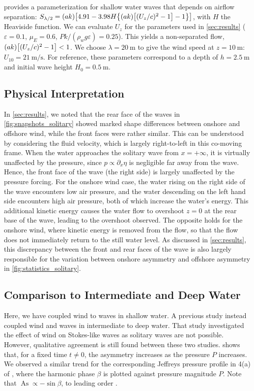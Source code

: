\documentclass{jfm}
\DeclareMathOperator{\As}{As}
\renewcommand*{\epsilon}{\varepsilon}
\begin{document}
 provides a parameterization for shallow water
waves that depends on airflow separation: $S_{\lambda/2} =
(ak)\bqty{4.91-3.98 H\Bqty{(ak)\bqty{(U_z/c)^2-1} - 1}}$, with $H$ the
Heaviside function.
We can evaluate $U_z$ for the parameters used in \cref{sec:results}
($\epsilon=0.1$, $\mu_E = 0.6$, $Pk/(\rho_w g \epsilon) = 0.25$).
This yields a non-separated flow, $(ak)\bqty{(U_z/c)^2-1} < 1$.
We choose $\lambda = \SI{20}{\meter}$ to give the wind speed at
$z=\SI{10}{\meter}$: $U_{10} = \SI{21}{\meter\per\second}$.
For reference, these parameters correspond to a depth of $h =
\SI{2.5}{\meter}$ and initial wave height $H_0 = \SI{0.5}{\meter}$.

\subsection{Physical Interpretation}
In \cref{sec:results}, we noted that the rear face of the waves in
\cref{fig:snapshots_solitary} showed marked shape differences between
onshore and offshore wind, while the front faces were rather similar.
This can be understood by considering the fluid velocity, which is
largely right-to-left in this co-moving frame.
When the water approaches the solitary wave from $x = +\infty$, it is
virtually unaffected by the pressure, since $p \propto \partial_x \eta$
is negligible far away from the wave.
Hence, the front face of the wave (the right side) is largely unaffected
by the pressure forcing.
For the onshore wind case, the water rising on the right side of the
wave encounters low air pressure, and the water descending on the left
hand side encounters high air pressure, both of which increase the
water's energy.
This additional kinetic energy causes the water flow to overshoot $z=0$
at the rear base of the wave, leading to the overshoot observed.
The opposite holds for the onshore wind, where kinetic energy is removed
from the flow, so that the flow does not immediately return to the still
water level.
As discussed in \cref{sec:results}, this discrepancy between the front
and rear faces of the wave is also largely responsible for the variation
between onshore asymmetry and offshore asymmetry in
\cref{fig:statistics_solitary}.

\subsection{Comparison to Intermediate and Deep Water}
Here, we have coupled wind to waves in shallow water.
A previous study \citep{zdyrski2020wind} instead coupled wind and waves
in intermediate to deep water.
That study investigated the effect of wind on Stokes-like waves as
solitary waves are not possible.
However, qualitative agreement is still found between these two studies.
 shows that, for a fixed time $t \neq 0$,
the asymmetry increases as the pressure $P$ increases.
We observed a similar trend for the corresponding Jeffreys pressure
profile in \figname{} 4(a) of \citet{zdyrski2020wind}, where the
harmonic phase $\beta$ is plotted against pressure magnitude $P$.
Note that $\As \propto -\sin{\beta}$, to leading order \citep[\cf
eq.\ 3.55 of][]{zdyrski2020wind}.
\end{document}
